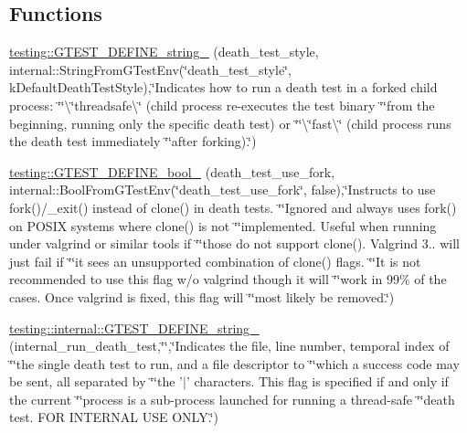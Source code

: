 \subsection*{Functions}
\begin{DoxyCompactItemize}
\item 
\hyperlink{namespacetesting_ad93c9ec89517d047ed323b79d96df251}{testing\-::\-G\-T\-E\-S\-T\-\_\-\-D\-E\-F\-I\-N\-E\-\_\-string\-\_\-} (death\-\_\-test\-\_\-style, internal\-::\-String\-From\-G\-Test\-Env(\char`\"{}death\-\_\-test\-\_\-style\char`\"{}, k\-Default\-Death\-Test\-Style),\char`\"{}Indicates how to run a death test in a forked child process\-: \char`\"{}\char`\"{}\textbackslash{}\char`\"{}threadsafe\textbackslash{}\char`\"{} (child process re-\/executes the test binary \char`\"{}\char`\"{}from the beginning, running only the specific death test) or \char`\"{}\char`\"{}\textbackslash{}\char`\"{}fast\textbackslash{}\char`\"{} (child process runs the death test immediately \char`\"{}\char`\"{}after forking).\char`\"{})
\item 
\hyperlink{namespacetesting_afee59458b05682d57d3a389e0903bc01}{testing\-::\-G\-T\-E\-S\-T\-\_\-\-D\-E\-F\-I\-N\-E\-\_\-bool\-\_\-} (death\-\_\-test\-\_\-use\-\_\-fork, internal\-::\-Bool\-From\-G\-Test\-Env(\char`\"{}death\-\_\-test\-\_\-use\-\_\-fork\char`\"{}, false),\char`\"{}Instructs to use fork()/\-\_\-exit() instead of clone() in death tests. \char`\"{}\char`\"{}Ignored and always uses fork() on P\-O\-S\-I\-X systems where clone() is not \char`\"{}\char`\"{}implemented. Useful when running under valgrind or similar tools if \char`\"{}\char`\"{}those do not support clone(). Valgrind 3.. will just fail if \char`\"{}\char`\"{}it sees an unsupported combination of clone() flags. \char`\"{}\char`\"{}It is not recommended to use this flag w/o valgrind though it will \char`\"{}\char`\"{}work in 99\% of the cases. Once valgrind is fixed, this flag will \char`\"{}\char`\"{}most likely be removed.\char`\"{})
\item 
\hyperlink{namespacetesting_1_1internal_a1b4d550272b7346726a5b4976d5c7aca}{testing\-::internal\-::\-G\-T\-E\-S\-T\-\_\-\-D\-E\-F\-I\-N\-E\-\_\-string\-\_\-} (internal\-\_\-run\-\_\-death\-\_\-test,\char`\"{}\char`\"{},\char`\"{}Indicates the file, line number, temporal index of \char`\"{}\char`\"{}the single death test to run, and a file descriptor to \char`\"{}\char`\"{}which a success code may be sent, all separated by \char`\"{}\char`\"{}the '$\vert$' characters.  This flag is specified if and only if the current \char`\"{}\char`\"{}process is a sub-\/process launched for running a thread-\/safe \char`\"{}\char`\"{}death test.  F\-O\-R I\-N\-T\-E\-R\-N\-A\-L U\-S\-E O\-N\-L\-Y.\char`\"{})
\end{DoxyCompactItemize}


